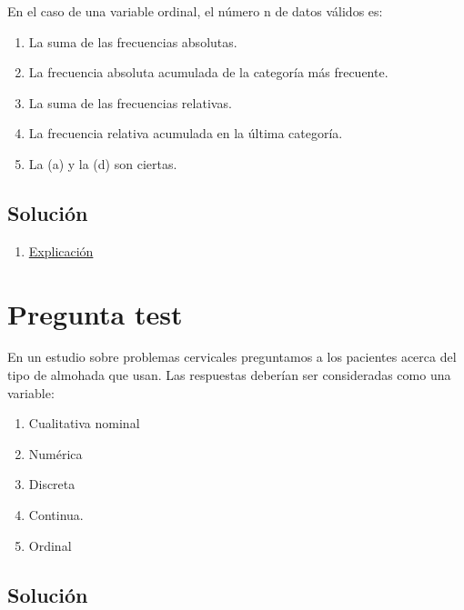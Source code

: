 \documentclass[
]{book}
\providecommand{\tightlist}{%
  \setlength{\itemsep}{0pt}\setlength{\parskip}{0pt}}
\begin{document}
En el caso de una variable ordinal, el número n de datos válidos es:

\begin{enumerate}
\def\labelenumi{\alph{enumi})}
\tightlist
\item
  La suma de las frecuencias absolutas.
\item
  La frecuencia absoluta acumulada de la categoría más frecuente.
\item
  La suma de las frecuencias relativas.
\item
  La frecuencia relativa acumulada en la última categoría.
\item
  La (a) y la (d) son ciertas.
\end{enumerate}

\hypertarget{soluciuxf3n-3}{%
\subsection{Solución}\label{soluciuxf3n-3}}

\begin{enumerate}
\def\labelenumi{\alph{enumi})}
\tightlist
\item
  \href{https://1fjmanzano.github.io/bioestadistica/tablas-de-frecuencias.html}{Explicación}
\end{enumerate}

\hypertarget{pregunta-test-3}{%
\section{Pregunta test}\label{pregunta-test-3}}

En un estudio sobre problemas cervicales preguntamos a los pacientes acerca del tipo de almohada que usan. Las respuestas deberían ser consideradas como una variable:

\begin{enumerate}
\def\labelenumi{\alph{enumi})}
\tightlist
\item
  Cualitativa nominal
\item
  Numérica
\item
  Discreta
\item
  Continua.
\item
  Ordinal
\end{enumerate}

\hypertarget{soluciuxf3n-4}{%
\subsection{Solución}\label{soluciuxf3n-4}}
\end{document}
